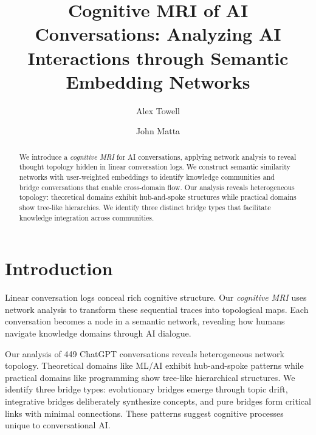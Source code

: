 \documentclass{svproc}
\begin{document}
\mainmatter
\title{Cognitive MRI of AI Conversations: Analyzing AI Interactions through Semantic Embedding Networks}


\author{Alex Towell \and John Matta}


\maketitle

\begin{abstract}
We introduce a \emph{cognitive MRI} for AI conversations, applying network analysis to reveal thought topology hidden in linear conversation logs. We construct semantic similarity networks with user-weighted embeddings to identify knowledge communities and bridge conversations that enable cross-domain flow. Our analysis reveals heterogeneous topology: theoretical domains exhibit hub-and-spoke structures while practical domains show tree-like hierarchies. We identify three distinct bridge types that facilitate knowledge integration across communities.
\end{abstract}

\section{Introduction}

Linear conversation logs conceal rich cognitive structure. Our \emph{cognitive MRI} uses network analysis to transform these sequential traces into topological maps. Each conversation becomes a node in a semantic network, revealing how humans navigate knowledge domains through AI dialogue.

Our analysis of 449 ChatGPT conversations reveals heterogeneous network topology. Theoretical domains like ML/AI exhibit hub-and-spoke patterns while practical domains like programming show tree-like hierarchical structures. We identify three bridge types: evolutionary bridges emerge through topic drift, integrative bridges deliberately synthesize concepts, and pure bridges form critical links with minimal connections. These patterns suggest cognitive processes unique to conversational AI.
\end{document}

